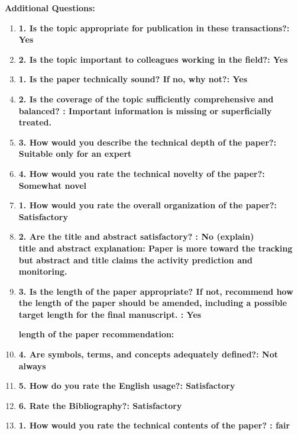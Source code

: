 \documentclass[12pt]{article}
\begin{document}
\textbf{Additional Questions:}

\begin{enumerate}

\item \textbf{1. Is the topic appropriate for publication in these transactions?: Yes}

\item \textbf{2. Is the topic important to colleagues working in the field?: Yes}

\item \textbf{1. Is the paper technically sound? If no, why not?: Yes}


\item \textbf{2. Is the coverage of the topic sufficiently comprehensive and balanced? : 
Important information is missing or superficially treated.}

\item \textbf{3. How would you describe the technical depth of the paper?: Suitable only 
for an expert}

\item \textbf{4. How would you rate the technical novelty of the paper?: Somewhat novel}

\item \textbf{1. How would you rate the overall organization of the paper?: Satisfactory}

\item \textbf{2. Are the title and abstract satisfactory? : No (explain) \\
title and abstract explanation: Paper is more toward the tracking but abstract and title claims the activity prediction and monitoring.}

\item \textbf{3. Is the length of the paper appropriate? If not, recommend how the length 
of the paper should be amended, including a possible target length for the final 
manuscript. : Yes}

\textbf{length of the paper recommendation:}

\item \textbf{4. Are symbols, terms, and concepts adequately defined?: Not always}

\item \textbf{5. How do you rate the English usage?: Satisfactory}

\item \textbf{6. Rate the Bibliography?: Satisfactory}

\item \textbf{1. How would you rate the technical contents of the paper? : fair}


\end{enumerate}
\end{document}
